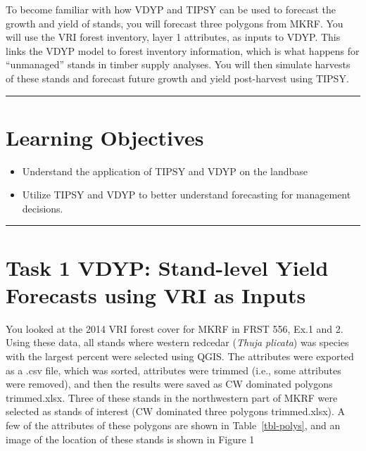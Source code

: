 \documentclass[
  letterpaper,
]{book}
\begin{document}
To become familiar with how VDYP and TIPSY can be used to forecast the
growth and yield of stands, you will forecast three polygons from MKRF.
You will use the VRI forest inventory, layer 1 attributes, as inputs to
VDYP. This links the VDYP model to forest inventory information, which
is what happens for ``unmanaged'' stands in timber supply analyses. You
will then simulate harvests of these stands and forecast future growth
and yield post-harvest using TIPSY.

\begin{center}\rule{0.5\linewidth}{0.5pt}\end{center}

\hypertarget{learning-objectives-5}{%
\section*{Learning Objectives}\label{learning-objectives-5}}


\begin{itemize}
\item
  Understand the application of TIPSY and VDYP on the landbase
\item
  Utilize TIPSY and VDYP to better understand forecasting for management
  decisions.
\end{itemize}

\begin{center}\rule{0.5\linewidth}{0.5pt}\end{center}

\hypertarget{task-1-vdyp-stand-level-yield-forecasts-using-vri-as-inputs}{%
\section*{Task 1 VDYP: Stand-level Yield Forecasts using VRI as
Inputs}\label{task-1-vdyp-stand-level-yield-forecasts-using-vri-as-inputs}}


You looked at the 2014 VRI forest cover for MKRF in FRST 556, Ex.1 and
2. Using these data, all stands where western redcedar (\emph{Thuja
plicata}) was species with the largest percent were selected using QGIS.
The attributes were exported as a .csv file, which was sorted,
attributes were trimmed (i.e., some attributes were removed), and then
the results were saved as CW dominated polygons trimmed.xlsx. Three of
these stands in the northwestern part of MKRF were selected as stands of
interest (CW dominated three polygons trimmed.xlsx). A few of the
attributes of these polygons are shown in Table~\ref{tbl-polys}, and an
image of the location of these stands is shown in Figure 1
\end{document}
